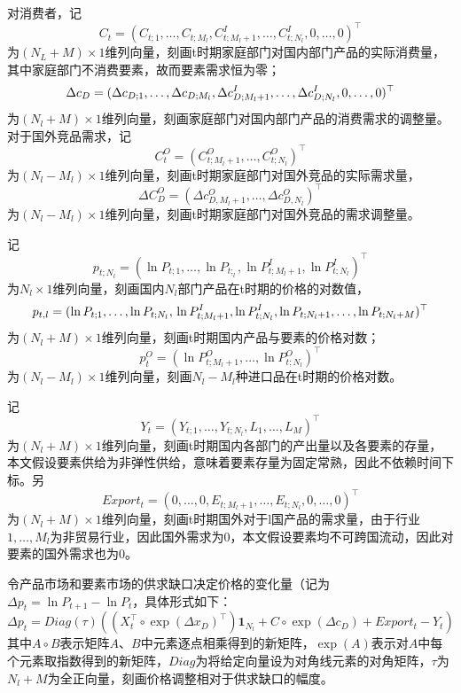 \documentclass{article}
\begin{document}
对消费者，记$$C_t=(C_{t;1},\dots,C_{t;M_l}, C^I_{t;M_l+1},\dots,C_{t;N_l}^I,0,\dots,0)^\top$$为$(N_L+M)\times 1$维列向量，刻画t时期家庭部门对国内部门产品的实际消费量，其中家庭部门不消费要素，故而要素需求恒为零；$$\Delta c_D=(\Delta c_{D;1},\dots,\Delta c_{D;M_l}, \\\Delta c^I_{D;M_l+1},\dots,\Delta c_{D;N_l}^I,0,\dots,0)^\top$$为$(N_l+M)\times 1$维列向量，刻画家庭部门对国内部门产品的消费需求的调整量。对于国外竞品需求，记$$C_t^O=(C_{t;M_l+1}^O,\dots,C_{t;N_l}^O)^\top$$为$(N_l-M_l)\times1$维列向量，刻画t时期家庭部门对国外竞品的实际需求量，$$\Delta C^O_D=(\Delta c_{D,M_l+1}^O,\dots,\Delta c_{D,N_l}^O)^\top$$为$(N_l-M_l)\times1$维列向量，刻画t时期家庭部门对国外竞品的需求调整量。



记$$p_{t;N_l}=(\ln P_{t;1},\dots,\ln P_{t;_l},\ln P^I_{t;M_l+1},\ln P^I_{t;N_l})^\top$$为$N_l\times1$维列向量，刻画国内$N_l$部门产品在t时期的价格的对数值，$$p_{t,l}=(\ln P_{t;1},\dots,\ln P_{t;N_l},\\\ln P^I_{t;M_l+1},\ln P^I_{t;N_l},\ln P_{t;N_l+1},\dots,\ln P_{t;N_l+M})^\top$$为$(N_l+M)\times1$维列向量，刻画t时期国内产品与要素的价格对数；$$p_{t}^O=(\ln P^O_{t;M_l+1},\dots,\ln P^O_{t;N_l})^\top$$为$(N_l-M_l)\times1$维列向量，刻画$N_l-M_l$种进口品在t时期的价格对数。

记$$Y_t=(Y_{t;1},\dots,Y_{t;N_l},L_1,\dots,L_M)^\top$$为$(N_l+M)\times 1$维列向量，刻画t时期国内各部门的产出量以及各要素的存量，本文假设要素供给为非弹性供给，意味着要素存量为固定常熟，因此不依赖时间下标。另$$Export_t=(0,\dots,0,E_{t;M_l+1},\dots,E_{t;N_l},0,\dots,0)^\top$$为$(N_l+M)\times 1$维列向量，刻画t时期国外对于l国产品的需求量，由于行业$1,\dots,M_l$为非贸易行业，因此国外需求为0，本文假设要素均不可跨国流动，因此对要素的国外需求也为0。

令产品市场和要素市场的供求缺口决定价格的变化量（记为$\Delta p_t=\ln P_{t+1}-\ln P_t$，具体形式如下：
\begin{equation}\label{dp}
    \Delta p_t=Diag(\tau)\left(\left(X_t^\top\circ \exp(\Delta x_D)^\top\right)\mathbf{1}_{N_l}+C\circ\exp(\Delta c_D)+Export_t-Y_t\right)
\end{equation} 其中$A\circ B$表示矩阵$A$、$B$中元素逐点相乘得到的新矩阵，$\exp(A)$表示对$A$中每个元素取指数得到的新矩阵，$Diag$为将给定向量设为对角线元素的对角矩阵，$\tau$为$N_l+M$为全正向量，刻画价格调整相对于供求缺口的幅度。
\end{document}
